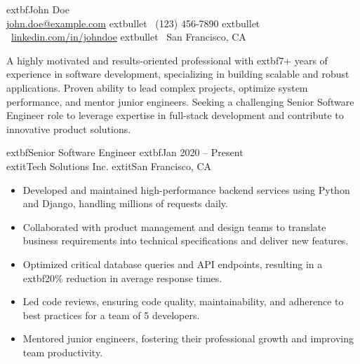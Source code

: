 \documentclass[letterpaper,10pt]{article}
\begin{document}
\Justifying %

\begin{center}
    	extbf{\Large John Doe} \\
    \href{mailto:john.doe@example.com}{\color{black}john.doe@example.com} 	extbullet \ (123) 456-7890 	extbullet \ \href{https://www.linkedin.com/in/johndoe}{\color{blue}linkedin.com/in/johndoe} 	extbullet \ San Francisco, CA
\end{center}
\vspace{-0.2cm} %

A highly motivated and results-oriented professional with 	extbf{7+ years of experience} in software development, specializing in building scalable and robust applications. Proven ability to lead complex projects, optimize system performance, and mentor junior engineers. Seeking a challenging Senior Software Engineer role to leverage expertise in full-stack development and contribute to innovative product solutions.


	extbf{Senior Software Engineer} \hfill 	extbf{Jan 2020 – Present} \\
	extit{Tech Solutions Inc.} \hfill 	extit{San Francisco, CA}
\begin{itemize}
    \item Developed and maintained high-performance backend services using Python and Django, handling millions of requests daily.
    \item Collaborated with product management and design teams to translate business requirements into technical specifications and deliver new features.
    \item Optimized critical database queries and API endpoints, resulting in a 	extbf{20\% reduction} in average response times.
    \item Led code reviews, ensuring code quality, maintainability, and adherence to best practices for a team of 5 developers.
    \item Mentored junior engineers, fostering their professional growth and improving team productivity.
\end{itemize}

\vspace{0.1cm}
\end{document}
